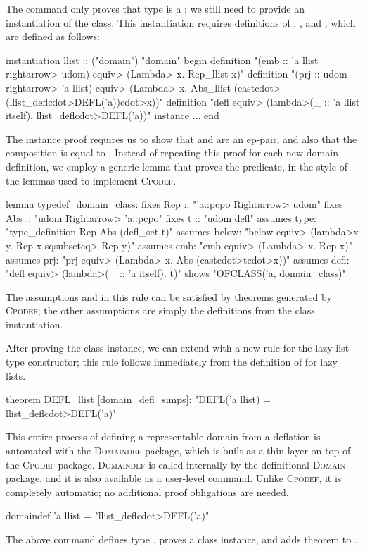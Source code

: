 The  command only proves that type  is a ; we still need to provide an instantiation of the  class. This instantiation requires definitions of , , and , which are defined as follows:
%
\begin{isacode}
instantiation llist :: ("domain") "domain"
begin
  definition "(emb :: 'a llist \<rightarrow> udom) \<equiv> (\<Lambda> x. Rep_llist x)"
  definition "(prj :: udom \<rightarrow> 'a llist) \<equiv>
      (\<Lambda> x. Abs_llist (cast\<cdot>(llist_defl\<cdot>DEFL('a))\<cdot>x))"
  definition "defl \<equiv> (\<lambda>(_ :: 'a llist itself). llist_defl\<cdot>DEFL('a))"
  instance ...
end
\end{isacode}
%
The instance proof requires us to show that  and  are an ep-pair, and also that the composition  is equal to . Instead of repeating this proof for each new domain definition, we employ a generic lemma that proves the  predicate, in the style of the lemmas used to implement \textsc{Cpodef}.
%
\begin{isacode}
lemma typedef_domain_class:
  fixes Rep :: "'a::pcpo \<Rightarrow> udom"
  fixes Abs :: "udom \<Rightarrow> 'a::pcpo"
  fixes t :: "udom defl"
  assumes type: "type_definition Rep Abs (defl_set t)"
  assumes below: "below \<equiv> (\<lambda>x y. Rep x \<sqsubseteq> Rep y)"
  assumes emb: "emb \<equiv> (\<Lambda> x. Rep x)"
  assumes prj: "prj \<equiv> (\<Lambda> x. Abs (cast\<cdot>t\<cdot>x))"
  assumes defl: "defl \<equiv> (\<lambda>(_ :: 'a itself). t)"
  shows "OFCLASS('a, domain_class)"
\end{isacode}
%
The assumptions  and  in this rule can be satisfied by theorems generated by \textsc{Cpodef}; the other assumptions are simply the definitions from the  class instantiation.

After proving the class instance, we can extend  with a new rule for the lazy list type constructor; this rule follows immediately from the definition of  for lazy lists.
%
\begin{isacode}
theorem DEFL_llist [domain_defl_simps]: "DEFL('a llist) = llist_defl\<cdot>DEFL('a)"
\end{isacode}

This entire process of defining a representable domain from a deflation is automated with the \textsc{Domaindef} package, which is built as a thin layer on top of the \textsc{Cpodef} package. \textsc{Domaindef} is called internally by the definitional \textsc{Domain} package, and it is also available as a user-level command. Unlike \textsc{Cpodef}, it is completely automatic; no additional proof obligations are needed.
%
\begin{isacode}
domaindef 'a llist = "llist_defl\<cdot>DEFL('a)"
\end{isacode}
%
The above  command defines type , proves a  class instance, and adds theorem  to .

